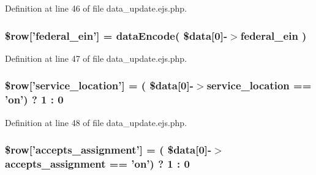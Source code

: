 \-Definition at line 46 of file data\-\_\-update.\-ejs.\-php.

\hypertarget{patientfile_2immnunization_2data__update_8ejs_8php_ab89a458f1e0bf0241b5dbb11f14f56e3}{
\subsubsection[{\$row}]{\setlength{\rightskip}{0pt plus 5cm}\$row\mbox{[}'federal\-\_\-ein'\mbox{]} = {\bf data\-Encode}( \$data\mbox{[}0\mbox{]}-\/$>$federal\-\_\-ein )}}\label{patientfile_2immnunization_2data__update_8ejs_8php_ab89a458f1e0bf0241b5dbb11f14f56e3}


\-Definition at line 47 of file data\-\_\-update.\-ejs.\-php.

\hypertarget{patientfile_2immnunization_2data__update_8ejs_8php_abb2e5d696b624c8bca263c29503b7350}{
\subsubsection[{\$row}]{\setlength{\rightskip}{0pt plus 5cm}\$row\mbox{[}'service\-\_\-location'\mbox{]} = ( \$data\mbox{[}0\mbox{]}-\/$>$service\-\_\-location == 'on') ? 1 \-: 0}}\label{patientfile_2immnunization_2data__update_8ejs_8php_abb2e5d696b624c8bca263c29503b7350}


\-Definition at line 48 of file data\-\_\-update.\-ejs.\-php.

\hypertarget{patientfile_2immnunization_2data__update_8ejs_8php_a11d3455aa396c9c69454f3e6fad3ec6c}{
\subsubsection[{\$row}]{\setlength{\rightskip}{0pt plus 5cm}\$row\mbox{[}'accepts\-\_\-assignment'\mbox{]} = ( \$data\mbox{[}0\mbox{]}-\/$>$accepts\-\_\-assignment == 'on') ? 1 \-: 0}}\label{patientfile_2immnunization_2data__update_8ejs_8php_a11d3455aa396c9c69454f3e6fad3ec6c}


